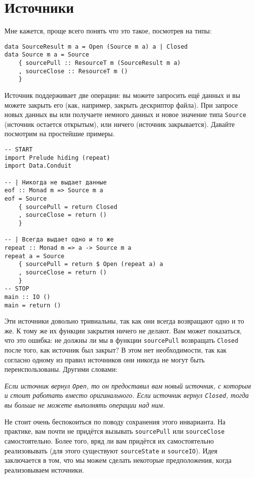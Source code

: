 {\section{Источники}

Мне кажется, проще всего понять что это такое, посмотрев на типы:
\begin{lstlisting}
data SourceResult m a = Open (Source m a) a | Closed
data Source m a = Source
    { sourcePull :: ResourceT m (SourceResult m a)
    , sourceClose :: ResourceT m ()
    }
\end{lstlisting}
Источник поддерживает две операции: вы можете запросить ещё данных и вы можете закрыть его (как,
например, закрыть дескриптор файла). При запросе новых данных вы или получаете немного
данных и новое значение типа \lstinline=Source= (источник остается открытым), или
ничего (источник закрывается). Давайте посмотрим на простейшие примеры.
\begin{lstlisting}
-- START
import Prelude hiding (repeat)
import Data.Conduit

-- | Никогда не выдает данные
eof :: Monad m => Source m a
eof = Source
    { sourcePull = return Closed
    , sourceClose = return ()
    }

-- | Всегда выдает одно и то же
repeat :: Monad m => a -> Source m a
repeat a = Source
    { sourcePull = return $ Open (repeat a) a
    , sourceClose = return ()
    }
-- STOP
main :: IO ()
main = return ()
\end{lstlisting}
Эти источники довольно тривиальны, так как они всегда возвращают одно и то же. К тому
же их функции закрытия ничего не делают. Вам может показаться, что это ошибка: не должны ли 
мы в функции \lstinline=sourcePull= возвращать \lstinline=Closed= после того, как
источник был
закрыт? В этом нет необходимости, так как согласно одному из правил
источников они никогда не могут быть переиспользованы. Другими словами:
    
\textit{Если источник вернул \lstinline=Open=, то он предоставил вам новый источник, с
которым и
стоит работать вместо оригинального. Если источник вернул \lstinline=Closed=, тогда вы
больше не можете выполнять операции над ним.}
    
Не стоит очень беспокоиться по поводу сохранения этого инварианта. На практике, вам почти
не придётся вызывать \lstinline=sourcePull= или \lstinline=sourceClose= самостоятельно.
Более того, вряд ли вам придётся их самостоятельно реализовывать (для этого существуют
\lstinline=sourceState= и \lstinline=sourceIO=).
Идея заключается в том, что мы можем сделать некоторые предположения, когда реализовываем
источники.

}
